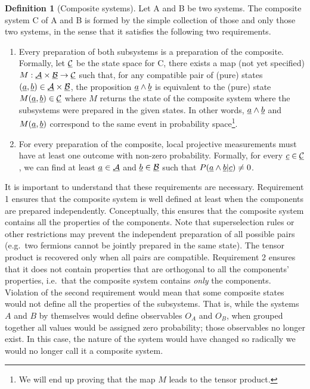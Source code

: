\documentclass[aps,prl,amsmath,amssymb,twocolumn,nofootinbib]{revtex4}
\theoremstyle{plain}
\theoremstyle{definition}
\newtheorem{defn}[thrm]{Definition}
\theoremstyle{remark}
\newcommand{\pj}[1] {\underbar{$#1$}}
\begin{document}
	\begin{defn}[Composite systems]\label{def_comp}
		Let A and B be two systems. The composite system C of A and B is formed by the simple collection of those and only those two systems, in the sense that it satisfies the following two requirements.
		\begin{enumerate}
			\item Every preparation of both subsystems is a preparation of the
			composite. Formally, let $\pj{\mathcal{C}}$ be the state space
			for C, there exists a map (not yet specified)
			$M:\pj{\mathcal{A}}\times\pj{\mathcal{B}}\to\pj{\mathcal{C}}$
			such that, for any compatible pair of (pure) states $(\pj{a},\pj{b}) \in \pj{\mathcal{A}}\times\pj{\mathcal{B}}$, the proposition $\pj{a} \wedge \pj{b}$ is equivalent to the (pure) state $M(\pj{a},\pj{b}) \in \pj{\mathcal{C}}$ where $M$ returns the state of the composite system where the subsystems were prepared in the given states. In other words, $\pj{a} \wedge \pj{b}$ and $M(\pj{a},\pj{b})$ correspond to the same event in probability space\footnote{We will end up proving that the map $M$ leads to the tensor product.}.
			\item For every preparation of the composite, local projective measurements must have at least one
			outcome with non-zero probability. Formally, for every $\pj{c} \in \pj{\mathcal{C}}$, we can find at least $\pj{a} \in \pj{\mathcal{A}}$ and $\pj{b} \in \pj{\mathcal{B}}$ such that $P(\pj{a} \wedge \pj{b}|\pj{c})\neq 0$. 
		\end{enumerate}
		It is important to understand that these requirements are necessary. Requirement 1 ensures that the composite system is well defined at least when the components are prepared independently. Conceptually, this ensures that the composite system contains all the properties of the components. Note that superselection rules or other restrictions may prevent the independent preparation of all possible pairs (e.g.~two fermions cannot be jointly prepared in the same state). The tensor product is recovered only when all pairs are compatible. Requirement 2 ensures that it does not contain properties that are orthogonal to all the components' properties, i.e.~that the composite system contains {\em only} the components. Violation of the second requirement would mean that some composite states would not define all the properties of the subsystems. That is, while the systems $A$ and $B$ by themselves would define observables $O_A$ and $O_B$, when grouped together all values would be assigned zero probability; those observables no longer exist. In this case, the nature of the system would have changed so radically we would no longer call it a composite system.
	\end{defn}
	
\end{document}
